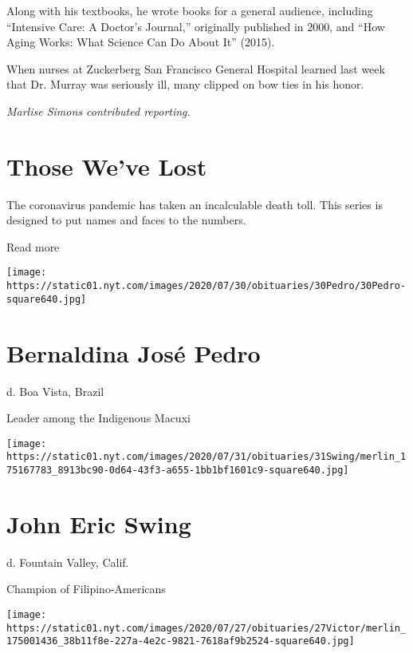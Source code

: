 Along with his textbooks, he wrote books for a general audience,
including ``Intensive Care: A Doctor's Journal,'' originally published
in 2000, and ``How Aging Works: What Science Can Do About It'' (2015).

When nurses at Zuckerberg San Francisco General Hospital learned last
week that Dr. Murray was seriously ill, many clipped on bow ties in his
honor.

\emph{Marlise Simons contributed reporting.}

\href{https://www.nytimes.com/interactive/2020/obituaries/people-died-coronavirus-obituaries.html?action=click\&pgtype=Article\&state=default\&region=BELOW_MAIN_CONTENT\&context=covid_obits_promo}{}

\hypertarget{those-weve-lost}{%
\section{Those We've Lost}\label{those-weve-lost}}

The coronavirus pandemic has taken an incalculable death toll. This
series is designed to put names and faces to the numbers.

Read more

\texttt{[image: https://static01.nyt.com/images/2020/07/30/obituaries/30Pedro/30Pedro-square640.jpg]}

\hypertarget{bernaldina-josuxe9-pedro}{%
\section{Bernaldina José Pedro}\label{bernaldina-josuxe9-pedro}}

d. Boa Vista, Brazil

Leader among the Indigenous Macuxi

\texttt{[image: https://static01.nyt.com/images/2020/07/31/obituaries/31Swing/merlin\_175167783\_8913bc90-0d64-43f3-a655-1bb1bf1601c9-square640.jpg]}

\hypertarget{john-eric-swing}{%
\section{John Eric Swing}\label{john-eric-swing}}

d. Fountain Valley, Calif.

Champion of Filipino-Americans

\texttt{[image: https://static01.nyt.com/images/2020/07/27/obituaries/27Victor/merlin\_175001436\_38b11f8e-227a-4e2c-9821-7618af9b2524-square640.jpg]}

